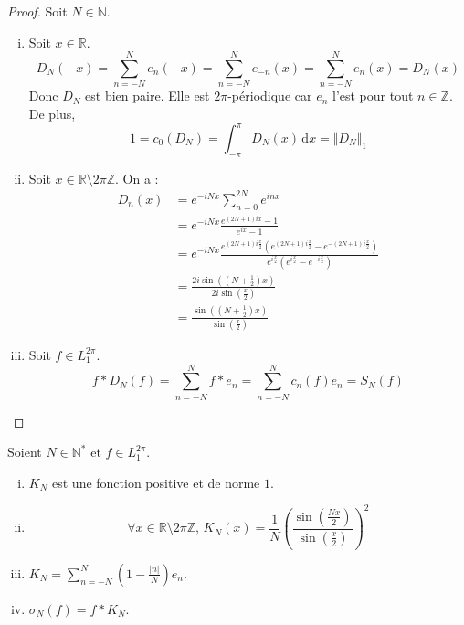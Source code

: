 	\begin{proof}
		Soit $N \in \mathbb{N}$.
		\begin{enumerate}[(i)]
			\item Soit $x \in \mathbb{R}$.
			\[ D_N(-x) = \sum_{n=-N}^{N} e_n(-x) = \sum_{n=-N}^{N} e_{-n}(x) = \sum_{n=-N}^{N} e_n(x) = D_N(x) \]
			Donc $D_N$ est bien paire. Elle est $2\pi$-périodique car $e_n$ l'est pour tout $n \in \mathbb{Z}$. De plus,
			\[ 1 = c_0(D_N) = \int_{-\pi}^{\pi} D_N(x) \, \mathrm{d}x = \Vert D_N \Vert_1 \]
			\item Soit $x \in \mathbb{R}\setminus 2\pi\mathbb{Z}$. On a :
			\begin{align*}
				D_n(x) &= e^{-iNx} \sum_{n=0}^{2N} e^{inx} \\
				&= e^{-iNx} \frac{e^{(2N+1)ix} - 1}{e^{ix} - 1} \\
				&= e^{-iNx} \frac{e^{(2N+1) i\frac{x}{2}} \left ( e^{(2N+1) i\frac{x}{2}} - e^{-(2N+1) i\frac{x}{2}} \right )}{e^{i\frac{x}{2}} \left( e^{i\frac{x}{2}} - e^{-i \frac{x}{2}} \right)} \\
				&= \frac{2i \sin \left( \left( N + \frac{1}{2} \right) x \right)}{2i \sin \left ( \frac{x}{2} \right)} \\
				&= \frac{\sin \left( \left( N + \frac{1}{2} \right) x \right)}{\sin \left ( \frac{x}{2} \right)}
			\end{align*}
			\item Soit $f \in L_1^{2 \pi}$.
			\[ f * D_N(f) = \sum_{n=-N}^N f * e_n = \sum_{n=-N}^N c_n(f) e_n = S_N(f) \]
		\end{enumerate}
	\end{proof}
	
	\begin{lemma}
		\label{theoreme-de-fejer-2}
		Soient $N \in \mathbb{N}^*$ et $f \in L_1^{2 \pi}$.
		\begin{enumerate}[(i)]
			\item $K_N$ est une fonction positive et de norme $1$.
			\item \[ \forall x \in \mathbb{R} \setminus 2 \pi \mathbb{Z}, \, K_N(x) = \frac{1}{N} \left(\frac{\sin \left( \frac{Nx}{2} \right)}{\sin \left( \frac{x}{2} \right)}\right)^2 \]
			\item $K_N = \sum_{n=-N}^{N} \left(1 - \frac{\vert n \vert}{N}\right) e_n$.
			\item $\sigma_N(f) = f * K_N$.
		\end{enumerate}
	\end{lemma}
	
